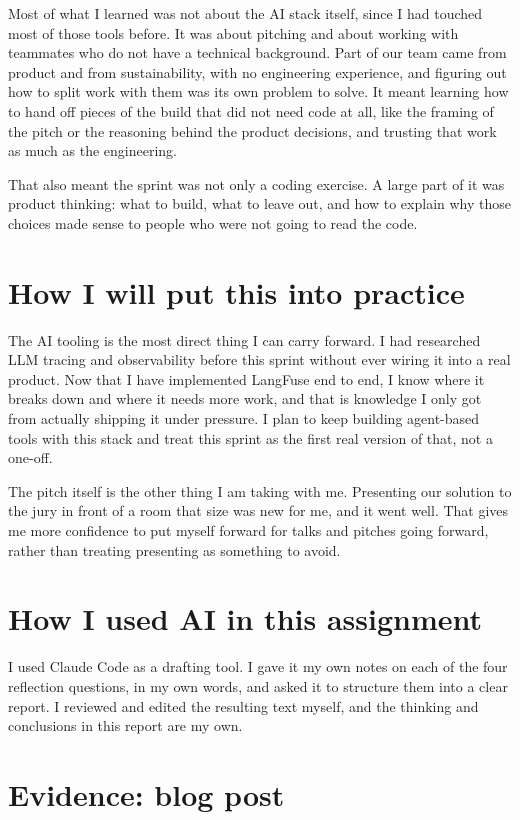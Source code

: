 \documentclass[11pt,a4paper]{article}
\begin{document}
Most of what I learned was not about the AI stack itself, since I had touched
most of those tools before. It was about pitching and about working with
teammates who do not have a technical background. Part of our team came from
product and from sustainability, with no engineering experience, and figuring
out how to split work with them was its own problem to solve. It meant
learning how to hand off pieces of the build that did not need code at all,
like the framing of the pitch or the reasoning behind the product decisions,
and trusting that work as much as the engineering.

That also meant the sprint was not only a coding exercise. A large part of it
was product thinking: what to build, what to leave out, and how to explain why
those choices made sense to people who were not going to read the code.

\section*{How I will put this into practice}

The AI tooling is the most direct thing I can carry forward. I had researched
LLM tracing and observability before this sprint without ever wiring it into a
real product. Now that I have implemented LangFuse end to end, I know where it
breaks down and where it needs more work, and that is knowledge I only got
from actually shipping it under pressure. I plan to keep building agent-based
tools with this stack and treat this sprint as the first real version of that,
not a one-off.

The pitch itself is the other thing I am taking with me. Presenting our
solution to the jury in front of a room that size was new for me, and it went
well. That gives me more confidence to put myself forward for talks and
pitches going forward, rather than treating presenting as something to avoid.

\section*{How I used AI in this assignment}

I used Claude Code as a drafting tool. I gave it my own notes on each of the
four reflection questions, in my own words, and asked it to structure them
into a clear report. I reviewed and edited the resulting text myself, and the
thinking and conclusions in this report are my own.

\section*{Evidence: blog post}
\end{document}
